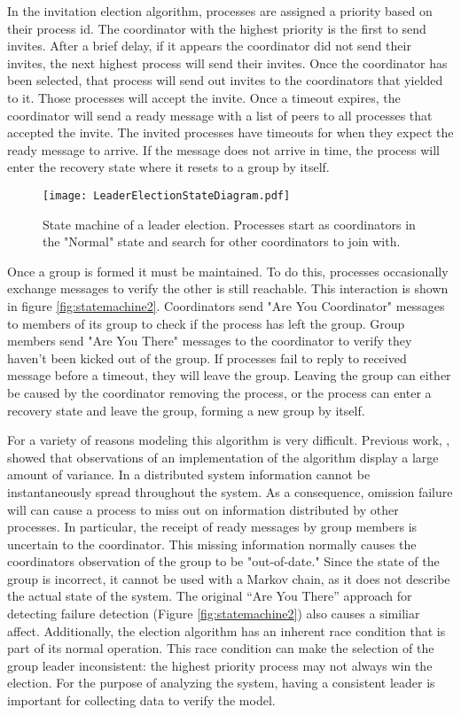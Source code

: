 In the invitation election algorithm, processes are assigned a priority based on their process id.
The coordinator with the highest priority is the first to send invites.
After a brief delay, if it appears the coordinator did not send their invites, the next highest process will send their invites.
Once the coordinator has been selected, that process will send out invites to the coordinators that yielded to it.
Those processes will accept the invite.
Once a timeout expires, the coordinator will send a ready message with a list of peers to all processes that accepted the invite.
The invited processes have timeouts for when they expect the ready message to arrive.
If the message does not arrive in time, the process will enter the recovery state where it resets to a group by itself.

\begin{figure}
\texttt{[image: LeaderElectionStateDiagram.pdf]}
\caption{State machine of a leader election. Processes start as coordinators in the "Normal" state and search for other coordinators to join with.}
\label{fig:statemachine}
\end{figure}

Once a group is formed it must be maintained.
To do this, processes occasionally exchange messages to verify the other is still reachable.
This interaction is shown in figure \ref{fig:statemachine2}.
Coordinators send "Are You Coordinator" messages to members of its group to check if the process has left the group.
Group members send "Are You There" messages to the coordinator to verify they haven't been kicked out of the group.
If processes fail to reply to received message before a timeout, they will leave the group.
Leaving the group can either be caused by the coordinator removing the process, or the process can enter a recovery state and leave the group, forming a new group by itself.

For a variety of reasons modeling this algorithm is very difficult.
Previous work, \cite{CRITIS2012}, showed that observations of an implementation of the algorithm display a large amount of variance.
In a distributed system information cannot be instantaneously spread throughout the system.
As a consequence, omission failure will can cause a process to miss out on information distributed by other processes.
In particular, the receipt of ready messages by group members is uncertain to the coordinator.
This missing information normally causes the coordinators observation of the group to be "out-of-date."
Since the state of the group is incorrect, it cannot be used with a Markov chain, as it does not describe the actual state of the system.
The original ``Are You There'' approach for detecting failure detection (Figure \ref{fig:statemachine2}) also causes a similiar affect.
Additionally, the election algorithm has an inherent race condition that is part of its normal operation.
This race condition can make the selection of the group leader inconsistent: the highest priority process may not always win the election.
For the purpose of analyzing the system, having a consistent leader is important for collecting data to verify the model.

